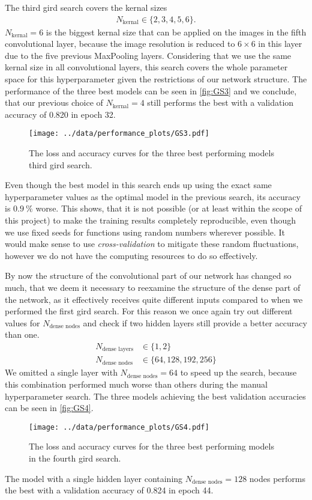 The third gird search covers the kernal sizes
\begin{align}
    N_\text{kernal} \in \{2, 3, 4, 5, 6\}.
\end{align}
$N_\text{kernal} = 6$ is the biggest kernal size that can be applied on the images in the fifth convolutional layer, because the image resolution is reduced to $6\times 6$ in this layer 
due to the five previous MaxPooling layers.
Considering that we use the same kernal size in all convolutional layers, this search covers the whole parameter space for this hyperparameter given the restrictions of our network structure.
The performance of the three best models can be seen in \autoref{fig:GS3} and we conclude, that our previous choice of $N_\text{kernal} = 4$ still performs the best 
with a validation accuracy of 0.820 in epoch 32.
\begin{figure}
    \centering
    \texttt{[image: ../data/performance\_plots/GS3.pdf]}
    \caption{The loss and accuracy curves for the three best performing models third gird search.}
    \label{fig:GS3}
\end{figure}
Even though the best model in this search ends up using the exact same hyperparameter values as the optimal model in the previous search, its accuracy is $\SI{0.9}{\percent}$ worse.
This shows, that it is not possible (or at least within the scope of this project) to make the training results completely reproducible, even though we use fixed seeds for functions using
random numbers wherever possible. 
It would make sense to use \textit{cross-validation} to mitigate these random fluctuations, however we do not have the computing resources to do so effectively.

By now the structure of the convolutional part of our network has changed so much, that we deem it necessary to reexamine the structure of the dense part of the network, as it effectively
receives quite different inputs compared to when we performed the first gird search.
For this reason we once again try out different values for $N_\text{dense nodes}$ and check if two hidden layers still provide a better accuracy than one.
\begin{align}
    N_\text{dense layers} &\in \{1, 2\} \\
    N_\text{dense nodes} &\in \{64, 128, 192, 256\}
\end{align}
We omitted a single layer with $N_\text{dense nodes} = 64$ to speed up the search, because this combination performed much worse than others during the manual hyperparameter search.
The three models achieving the best validation accuracies can be seen in \autoref{fig:GS4}.
\begin{figure}
    \centering
    \texttt{[image: ../data/performance\_plots/GS4.pdf]}
    \caption{The loss and accuracy curves for the three best performing models in the fourth gird search.}
    \label{fig:GS4}
\end{figure}
The model with a single hidden layer containing $N_\text{dense nodes} = 128$ nodes performs the best with a validation accuracy of 0.824 in epoch 44.


